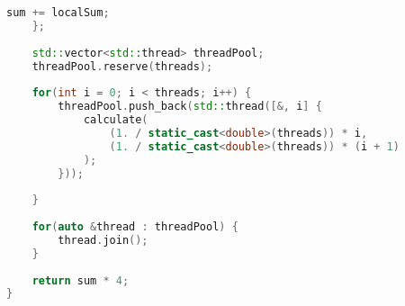 \begin{lstlisting}[caption=Funkcja \texttt{getPi()}, label={lst:getpi}, language=C++]
		sum += localSum;                                                             
	};                                                                               
                                                                                     
	std::vector<std::thread> threadPool;                                             
	threadPool.reserve(threads);                                                     
                                                                                     
	for(int i = 0; i < threads; i++) {                                               
		threadPool.push_back(std::thread([&, i] {                                    
			calculate(                                                               
				(1. / static_cast<double>(threads)) * i,                             
				(1. / static_cast<double>(threads)) * (i + 1)                        
			);                                                                       
		}));                                                                         
                                                                                     
	}                                                                                
                                                                                     
	for(auto &thread : threadPool) {                                                 
		thread.join();                                                               
	}                                                                                
                                                                                     
	return sum * 4;                                                                  
}                                                                                    
\end{lstlisting}

